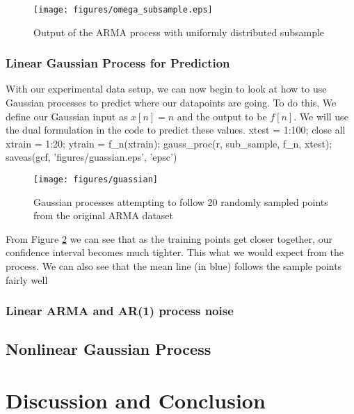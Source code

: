 \documentclass[11pt, twoside]{article}   	%
\newenvironment{matlab}{\comment}{\endcomment}
\begin{document}
\begin{figure}[h]
\centering
\texttt{[image: figures/omega\_subsample.eps]}
\caption{Output of the ARMA process with uniformly distributed subsample}
\label{fig:omega_subsample} 
\end{figure}
\FloatBarrier

\subsubsection{Linear Gaussian Process for Prediction}
With our experimental data setup, we can now begin to look at how to use
Gaussian processes to predict where our datapoints are going. To do this, 
We define our Gaussian input as $x[n] = n$ and the output to be $f[n]$. 
We will use the dual formulation in the code to predict these values.  
\begin{matlab}
xtest = 1:100;
close all
xtrain = 1:20; 
ytrain = f_n(xtrain); 
gauss_proc(r, sub_sample, f_n, xtest);
saveas(gcf, 'figures/guassian.eps', 'epsc')
\end{matlab}

\begin{figure}[h]
\centering
\texttt{[image: figures/guassian]}
\caption{Gaussian processes attempting to follow 20 randomly sampled points 
from the original ARMA dataset}
\label{fig:gaussian} 
\end{figure}
\FloatBarrier

From Figure \ref{fig:gaussian} we can see that as the training points get closer
together, our confidence interval becomes much tighter. This what we would 
expect from the process. We can also see that the mean line (in blue) follows
the sample points fairly well


\subsubsection{Linear ARMA and AR(1) process noise}
\subsection{Nonlinear Gaussian Process}

\section{Discussion and Conclusion}



\end{document}
